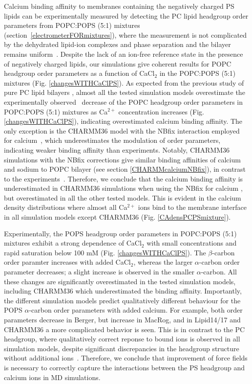 \documentclass[aps,prl,superscriptaddress,twocolumn]{revtex4}
\begin{document}
Calcium binding affinity to membranes containing the negatively charged PS lipids can be
experimentally measured by detecting the PC lipid headgroup order parameters
from POPC:POPS (5:1) mixtures (section~\ref{electrometerFORmixtures}),
where the measurement is not complicated by the dehydrated lipid-ion complexes and phase separation and the bilayer remains uniform~\cite{feigenson86,mattai89,roux90,roux91}.
Despite the lack of an ion-free reference state
in the presence of negatively charged lipids, our simulations give
coherent results for POPC headgroup order parameters as a function of
CaCl$_2$ in the POPC:POPS (5:1) mixtures (Fig. \ref{changesWITHCaClPS}).
As expected from the previous study of pure PC lipid
bilayers \cite{catte16}, almost all the tested simulation models overestimate the
experimentally observed~\cite{roux90} decrease of the POPC headgroup order parameters
in POPC:POPS (5:1) mixtures as Ca$^{2+}$ concentration increases (Fig. \ref{changesWITHCaClPS}),
indicating overestimated calcium binding affinity.
The only exception is the CHARMM36 model with the NBfix
interaction employed for calcium~\cite{kim16}, which underestimates the modulation of order parameters, 
indicating weaker binding affinity than experiments.
Notably, CHARMM36 simulations with the NBfix corrections \cite{venable13,kim16} give similar binding affinities of
calcium and sodium to POPC bilayer (see section \ref{CHARMMcalciumNBfix}), in contrast to the experiments~\cite{cevc90,akutsu81,altenbach84}. Therefore, we conclude that the calcium binding affinity
is underestimated in CHARMM36 simulations when using the NBfix for calcium \cite{kim16}, but overestimated 
in all the other tested models. This is evident in the calcium density distributions where almost all Ca$^{2+}$ ions bind to the membrane interface in all simulation models except CHARMM36 (Fig. \ref{CAdensPCPSmixture}).


Experimentally, the POPS headgroup order parameters in POPC:POPS (5:1) mixtures
exhibit a strong dependence of CaCl$_2$ with small concentrations and rapid saturation
below 100 mM (Fig. \ref{changesWITHCaClPS}). The $\beta$-carbon order paramter increases with added CaCl$_2$,
whereas the larger $\alpha$-carbon order parameter decreases; a slight increase is observed in
the smaller $\alpha$-carbon. All these changes are significantly overestimated in the
tested simulation models, including CHARMM36 which underestimated the binding affinity.
Importantly, the different simulation models predict qualitatively different behaviour
for the POPS $\alpha$-carbon order parameters with added calcium.
For example, both order parameters decrease in Berger, but increase
in MacRog, and in Lipid14/17 and CHARMM36 a more complicated behavior is seen.
This is in contrast to the PC headgroup, where
qualitatively correct reponse to bound ions is observed
in all simulation models, despite significant discrepancies in the headgroup
structure without additional ions~\cite{catte16}. Therefore, we conclude that
improvement of force fields is necessary to correctly capture the interactions between the
PS headgroup and calcium ions in MD simulations.
\end{document}

